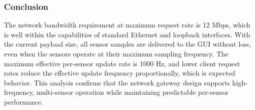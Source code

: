 \subsubsection{Conclusion}

The network bandwidth requirement at maximum request rate is 12 Mbps, which is well 
within the capabilities of standard Ethernet and loopback interfaces. With the current 
payload size, all sensor samples are delivered to the GUI without loss, even when the 
sensors operate at their maximum sampling frequency. The maximum effective per-sensor 
update rate is 1000 Hz, and lower client request rates reduce the effective update 
frequency proportionally, which is expected behavior. This analysis confirms that the 
network gateway design supports high-frequency, multi-sensor operation while 
maintaining predictable per-sensor performance.
